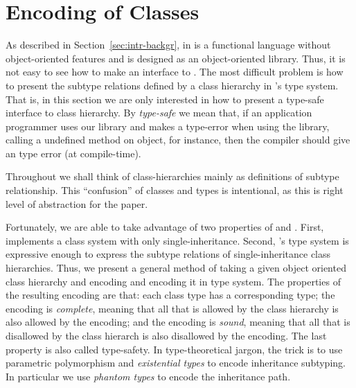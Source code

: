 \documentclass[workingdraft]{usetex-v1}
\begin{document}

\section{Encoding of Classes}
\label{sec:encoding-classes}

As described in Section~\ref{sec:intr-backgr}, \sml in is a functional
language without object-oriented features and \gtk is designed as an
object-oriented library.  Thus, it is not easy to see how to make an \sml
interface to \gtk.  The most difficult problem is how to present the
subtype relations defined by a class hierarchy in \sml's type system.
That is, in this section we are only interested in how to present a
type-safe \sml interface to \gtk class hierarchy.  By \emph{type-safe} we
mean that, if an \sml application programmer uses our library and
makes a type-error when using the \gtk library, calling a undefined
method on object, for instance, then the \sml compiler should give an
type error (at compile-time).

Throughout we shall think of class-hierarchies mainly as definitions
of subtype relationship.  This ``confusion'' of classes and types is
intentional, as this is right level of abstraction for the paper.

Fortunately, we are able to take advantage of two properties of \gtk
and \sml.  First, \gtk implements a class system with only
single-inheritance.  Second, \sml's type system is expressive enough
to express the subtype relations of single-inheritance class
hierarchies.  Thus, we present a general method of taking a given
object oriented class hierarchy and encoding and encoding it in \sml
type system.  The properties of the resulting encoding are that: each
class type has a corresponding \sml type; the encoding is
\emph{complete}, meaning that all that is allowed by the class
hierarchy is also allowed by the encoding; and the encoding is
\emph{sound}, meaning that all that is disallowed by the class
hierarch is also disallowed by the encoding.  The last property is
also called type-safety.  In type-theoretical jargon, the trick is to
use parametric polymorphism and \emph{existential types} to encode
inheritance subtyping.  In particular we use \emph{phantom types} to
encode the inheritance path.
\end{document}
